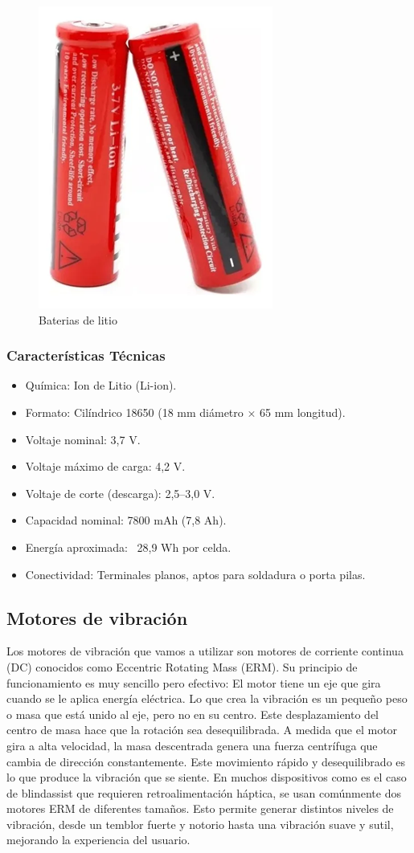 \documentclass[12pt,a4paper]{article}
\begin{document}
\begin{figure}[H]
\centering
\includegraphics[width=0.3\linewidth]{Carpeta tecnica/Imagen5.png}
\caption{Baterias de litio}
\end{figure}

\subsubsection{Características Técnicas}

\begin{itemize}
\item Química: Ion de Litio (Li-ion).

\item Formato: Cilíndrico 18650 (18 mm diámetro × 65 mm longitud).

\item Voltaje nominal: 3,7 V.

\item Voltaje máximo de carga: 4,2 V.

\item Voltaje de corte (descarga): 2,5–3,0 V.

\item Capacidad nominal: 7800 mAh (7,8 Ah).

\item Energía aproximada: ~28,9 Wh por celda.

\item Conectividad: Terminales planos, aptos para soldadura o porta pilas.
\end{itemize}

\subsection{Motores de vibración}
Los motores de vibración que vamos a utilizar son motores de corriente continua (DC) conocidos como Eccentric Rotating Mass (ERM). Su principio de funcionamiento es muy sencillo pero efectivo: El motor tiene un eje que gira cuando se le aplica energía eléctrica. Lo que crea la vibración es un pequeño peso o masa que está unido al eje, pero no en su centro. Este desplazamiento del centro de masa hace que la rotación sea desequilibrada. A medida que el motor gira a alta velocidad, la masa descentrada genera una fuerza centrífuga que cambia de dirección constantemente. Este movimiento rápido y desequilibrado es lo que produce la vibración que se siente. En muchos dispositivos como es el caso de blindassist que requieren retroalimentación háptica, se usan comúnmente dos motores ERM de diferentes tamaños. Esto permite generar distintos niveles de vibración, desde un temblor fuerte y notorio hasta una vibración suave y sutil, mejorando la experiencia del usuario.
\end{document}
